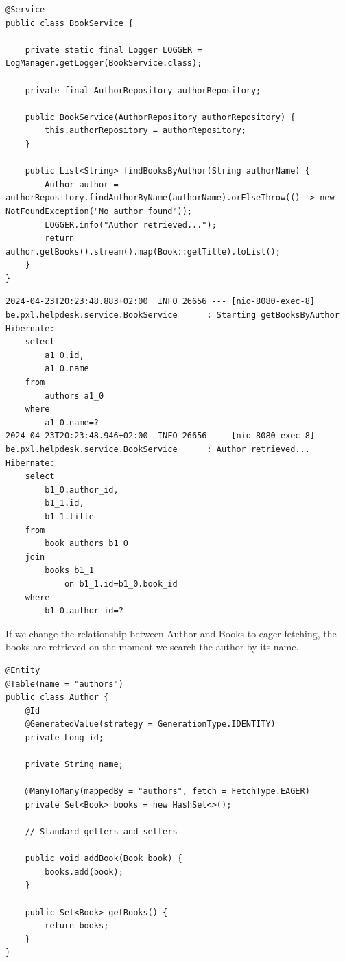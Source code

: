 \begin{lstlisting}
@Service
public class BookService {

    private static final Logger LOGGER = LogManager.getLogger(BookService.class);

    private final AuthorRepository authorRepository;

    public BookService(AuthorRepository authorRepository) {
        this.authorRepository = authorRepository;
    }

    public List<String> findBooksByAuthor(String authorName) {
        Author author = authorRepository.findAuthorByName(authorName).orElseThrow(() -> new NotFoundException("No author found"));
        LOGGER.info("Author retrieved...");
        return author.getBooks().stream().map(Book::getTitle).toList();
    }
}
\end{lstlisting}

\begin{verbatim}
2024-04-23T20:23:48.883+02:00  INFO 26656 --- [nio-8080-exec-8] be.pxl.helpdesk.service.BookService      : Starting getBooksByAuthor
Hibernate: 
    select
        a1_0.id,
        a1_0.name 
    from
        authors a1_0 
    where
        a1_0.name=?
2024-04-23T20:23:48.946+02:00  INFO 26656 --- [nio-8080-exec-8] be.pxl.helpdesk.service.BookService      : Author retrieved...
Hibernate: 
    select
        b1_0.author_id,
        b1_1.id,
        b1_1.title 
    from
        book_authors b1_0 
    join
        books b1_1 
            on b1_1.id=b1_0.book_id 
    where
        b1_0.author_id=?
\end{verbatim}

If we change the relationship between Author and Books to eager fetching, the books are retrieved on the moment we search the author by its name.


\begin{lstlisting}
@Entity
@Table(name = "authors")
public class Author {
    @Id
    @GeneratedValue(strategy = GenerationType.IDENTITY)
    private Long id;

    private String name;

    @ManyToMany(mappedBy = "authors", fetch = FetchType.EAGER)
    private Set<Book> books = new HashSet<>();

    // Standard getters and setters

    public void addBook(Book book) {
        books.add(book);
    }

    public Set<Book> getBooks() {
        return books;
    }
}
\end{lstlisting}


